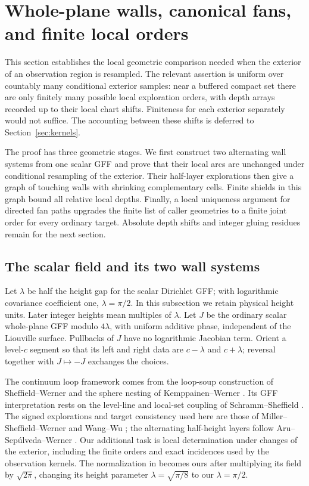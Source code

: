 \section{Whole-plane walls, canonical fans, and finite local orders}\label{sec:walls}

This section establishes the local geometric comparison needed when the exterior of an observation region is resampled.  The relevant assertion is uniform over countably many conditional exterior samples: near a buffered compact set there are only finitely many possible local exploration orders, with depth arrays recorded up to their local chart shifts.  Finiteness for each exterior separately would not suffice.  The accounting between these shifts is deferred to Section~\ref{sec:kernels}.

The proof has three geometric stages. We first construct two alternating
wall systems from one scalar GFF and prove that their local arcs are unchanged
under conditional resampling of the exterior. Their half-layer explorations
then give a graph of touching walls with shrinking complementary cells.
Finite shields in this graph bound all relative local depths. Finally, a
local uniqueness argument for directed fan paths upgrades the finite list
of caller geometries to a finite joint order for every ordinary target.
Absolute depth shifts and integer gluing residues remain for the next section.

\subsection{The scalar field and its two wall systems}

Let $\lambda$ be half the height gap for the scalar Dirichlet GFF; with logarithmic covariance coefficient one, $\lambda=\pi/2$.  In this subsection we retain physical height units.  Later integer heights mean multiples of $\lambda$.  Let $J$ be the ordinary scalar whole-plane GFF modulo $4\lambda$, with uniform additive phase, independent of the Liouville surface.  Pullbacks of $J$ have no logarithmic Jacobian term.  Orient a level-$c$ segment so that its left and right data are $c-\lambda$ and $c+\lambda$; reversal together with $J\mapsto-J$ exchanges the choices.

The continuum loop framework comes from the loop-soup construction of
Sheffield--Werner and the sphere nesting of Kemppainen--Werner
\cite{SWcle,KWnested}.  Its GFF interpretation rests on the level-line and
local-set coupling of Schramm--Sheffield \cite{SchrammSheffieldContour}.
The signed explorations and target consistency used here are those of
Miller--Sheffield--Werner and Wang--Wu \cite{MSWTrunk,WangWu}; the alternating
half-height layers follow Aru--Sep\'ulveda--Werner
\cite[Section~6.1 and Remark~19]{ASWlocal}.
Our additional task is local determination under changes of the exterior,
including the finite orders and exact incidences used by the observation
kernels.  The normalization in \cite{ASWlocal} becomes ours after multiplying
its field by $\sqrt{2\pi}$, changing its height parameter $\lambda=\sqrt{\pi/8}$ to
our $\lambda=\pi/2$.

